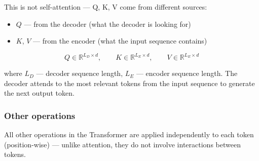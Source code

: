 \documentclass[10pt]{article}
\begin{document}
\begin{center}
\end{center}

This is not self-attention --- Q, K, V come from different sources:

\begin{itemize}
    \item $Q$ --- from the decoder (what the decoder is looking for)
    \item $K$, $V$ --- from the encoder (what the input sequence contains)
\end{itemize}

\begin{equation*}
Q \in \mathbb{R}^{L_{D} \times d}, \qquad
K \in \mathbb{R}^{L_{E} \times d}, \qquad
V \in \mathbb{R}^{L_{E} \times d}
\end{equation*}

where $L_D$ --- decoder sequence length, $L_E$ --- encoder sequence length. The decoder attends to the most relevant tokens from the input sequence to generate the next output token.


\subsubsection{Other operations}

All other operations in the Transformer are applied independently to each token (position-wise) --- unlike attention, they do not involve interactions between tokens.
\end{document}
